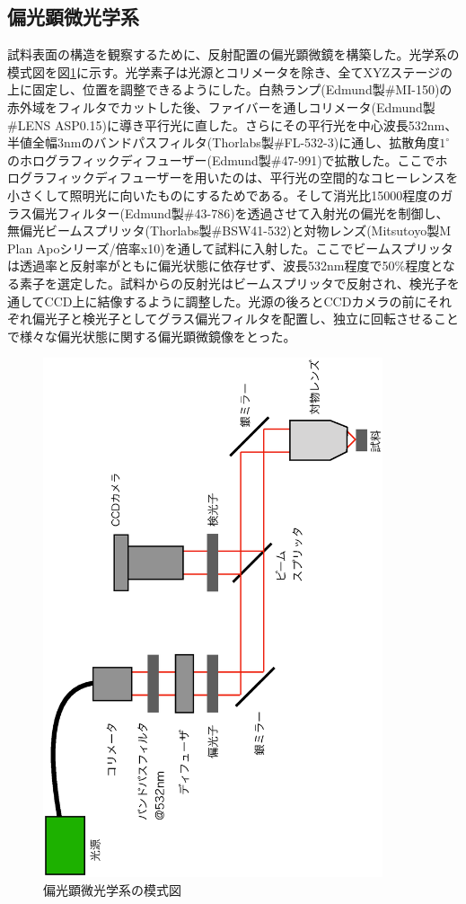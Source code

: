 \documentclass[11pt,a4paper]{jsarticle}
\begin{document}
\subsection{偏光顕微光学系}
試料表面の構造を観察するために、反射配置の偏光顕微鏡を構築した。光学系の模式図を図\ref{fig:microscope}に示す。光学素子は光源とコリメータを除き、全てXYZステージの上に固定し、位置を調整できるようにした。白熱ランプ(Edmund製\#MI-150)の赤外域をフィルタでカットした後、ファイバーを通しコリメータ(Edmund製\#LENS ASP0.15)に導き平行光に直した。さらにその平行光を中心波長532nm、半値全幅3nmのバンドパスフィルタ(Thorlabs製\#FL-532-3)に通し、拡散角度$1^\circ$のホログラフィックディフューザー(Edmund製\#47-991)で拡散した。ここでホログラフィックディフューザーを用いたのは、平行光の空間的なコヒーレンスを小さくして照明光に向いたものにするためである。そして消光比15000程度のガラス偏光フィルター(Edmund製\#43-786)を透過させて入射光の偏光を制御し、無偏光ビームスプリッタ(Thorlabs製\#BSW41-532)と対物レンズ(Mitsutoyo製M Plan Apoシリーズ/倍率x10)を通して試料に入射した。ここでビームスプリッタは透過率と反射率がともに偏光状態に依存せず、波長532nm程度で50\%程度となる素子を選定した。試料からの反射光はビームスプリッタで反射され、検光子を通してCCD上に結像するように調整した。光源の後ろとCCDカメラの前にそれぞれ偏光子と検光子としてグラス偏光フィルタを配置し、独立に回転させることで様々な偏光状態に関する偏光顕微鏡像をとった。
\begin{figure}[p]
  \begin{center}
   \includegraphics[width=100mm,angle=270]{microscope.eps}
  \end{center}
  \caption{偏光顕微光学系の模式図}
  \label{fig:microscope}
\end{figure}
\end{document}
